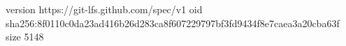 version https://git-lfs.github.com/spec/v1
oid sha256:8f0110c0da23ad416b26d283ca8f607229797bf3fd9434f8e7caea3a20cba63f
size 5148
